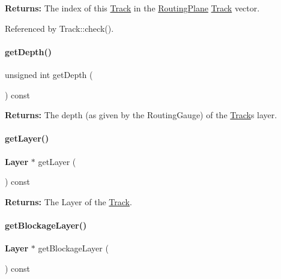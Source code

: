 {\bfseries Returns\+:} The index of this \hyperlink{classKite_1_1Track}{Track} in the \hyperlink{classKite_1_1RoutingPlane}{Routing\+Plane} \hyperlink{classKite_1_1Track}{Track} vector. 

Referenced by Track\+::check().

\mbox{\label{classKite_1_1Track_a6c4d9081746b8daa3e45e5e3dd185b60}} 
\paragraph{\texorpdfstring{get\+Depth()}{getDepth()}}
{\footnotesize\ttfamily unsigned int get\+Depth (\begin{DoxyParamCaption}{ }\end{DoxyParamCaption}) const}

{\bfseries Returns\+:} The depth (as given by the Routing\+Gauge) of the \hyperlink{classKite_1_1Track}{Track}\textquotesingle{}s layer. \mbox{\label{classKite_1_1Track_ab468d5fc5ad722f437b81decc8209ab7}} 
\paragraph{\texorpdfstring{get\+Layer()}{getLayer()}}
{\footnotesize\ttfamily \textbf{ Layer} $\ast$ get\+Layer (\begin{DoxyParamCaption}{ }\end{DoxyParamCaption}) const}

{\bfseries Returns\+:} The {\ttfamily Layer} of the \hyperlink{classKite_1_1Track}{Track}. \mbox{\label{classKite_1_1Track_aa719edbfb0c3d2f294cf658f1c6bfb37}} 
\paragraph{\texorpdfstring{get\+Blockage\+Layer()}{getBlockageLayer()}}
{\footnotesize\ttfamily \textbf{ Layer} $\ast$ get\+Blockage\+Layer (\begin{DoxyParamCaption}{ }\end{DoxyParamCaption}) const}

